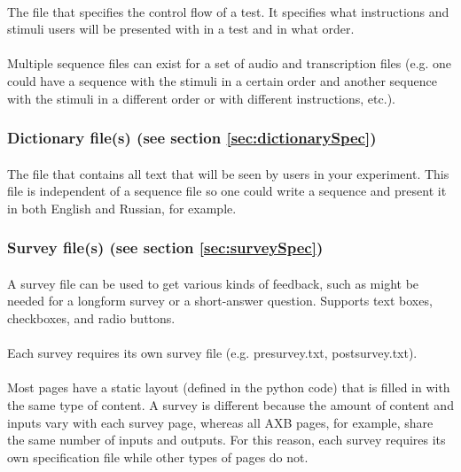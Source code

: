 \documentclass[12pt, oneside]{scrbook}   	%
\begin{document}
\paragraph{}
The file that specifies the control flow of a test.  It specifies what instructions and stimuli users will be presented with in a test and in what order. 

\paragraph{}
Multiple sequence files can exist for a set of audio and transcription files (e.g. one could have a sequence with the stimuli in a certain order and another sequence with the stimuli in a different order or with different instructions, etc.).

\subsubsection{Dictionary file(s) (see section \ref{sec:dictionarySpec})}

\paragraph{}
The file that contains all text that will be seen by users in your experiment.  This file is independent of a sequence file so one could write a sequence and present it in both English and Russian, for example.

\subsubsection{Survey file(s) (see section \ref{sec:surveySpec})}

\paragraph{}
A survey file can be used to get various kinds of feedback, such as might be needed for a longform survey or a short-answer question.  Supports text boxes, checkboxes, and radio buttons.

\paragraph{}
Each survey requires its own survey file (e.g. presurvey.txt, postsurvey.txt).

\paragraph{}
Most pages have a static layout (defined in the python code) that is filled in with the same type of content.  A survey is different because the amount of content and inputs vary with each survey page, whereas all AXB pages, for example, share the same number of inputs and outputs.  For this reason, each survey requires its own specification file while other types of pages do not.
\end{document}
